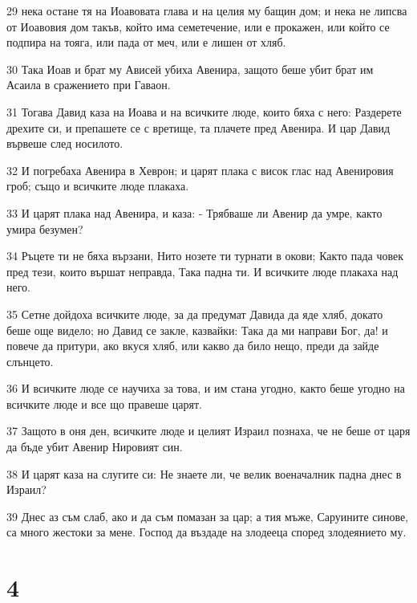 \par 29 нека остане тя на Иоавовата глава и на целия му бащин дом; и нека не липсва от Иоавовия дом такъв, който има семетечение, или е прокажен, или който се подпира на тояга, или пада от меч, или е лишен от хляб.
\par 30 Така Иоав и брат му Ависей убиха Авенира, защото беше убит брат им Асаила в сражението при Гаваон.
\par 31 Тогава Давид каза на Иоава и на всичките люде, които бяха с него: Раздерете дрехите си, и препашете се с вретище, та плачете пред Авенира. И цар Давид вървеше след носилото.
\par 32 И погребаха Авенира в Хеврон; и царят плака с висок глас над Авенировия гроб; също и всичките люде плакаха.
\par 33 И царят плака над Авенира, и каза: - Трябваше ли Авенир да умре, както умира безумен?
\par 34 Ръцете ти не бяха вързани, Нито нозете ти турнати в окови; Както пада човек пред тези, които вършат неправда, Така падна ти. И всичките люде плакаха над него.
\par 35 Сетне дойдоха всичките люде, за да предумат Давида да яде хляб, докато беше още видело; но Давид се закле, казвайки: Така да ми направи Бог, да! и повече да притури, ако вкуся хляб, или какво да било нещо, преди да зайде слънцето.
\par 36 И всичките люде се научиха за това, и им стана угодно, както беше угодно на всичките люде и все що правеше царят.
\par 37 Защото в оня ден, всичките люде и целият Израил познаха, че не беше от царя да бъде убит Авенир Нировият син.
\par 38 И царят каза на слугите си: Не знаете ли, че велик военачалник падна днес в Израил?
\par 39 Днес аз съм слаб, ако и да съм помазан за цар; а тия мъже, Саруините синове, са много жестоки за мене. Господ да въздаде на злодееца според злодеянието му.

\chapter{4}


